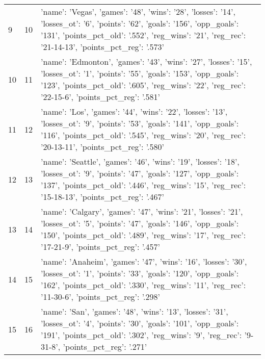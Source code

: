 \begin{tabular}{lrl}
9 & 10 & {'name': 'Vegas', 'games': '48', 'wins': '28', 'losses': '14', 'losses_ot': '6', 'points': '62', 'goals': '156', 'opp_goals': '131', 'points_pct_old': '.552', 'reg_wins': '21', 'reg_rec': '21-14-13', 'points_pct_reg': '.573'} \\
10 & 11 & {'name': 'Edmonton', 'games': '43', 'wins': '27', 'losses': '15', 'losses_ot': '1', 'points': '55', 'goals': '153', 'opp_goals': '123', 'points_pct_old': '.605', 'reg_wins': '22', 'reg_rec': '22-15-6', 'points_pct_reg': '.581'} \\
11 & 12 & {'name': 'Los', 'games': '44', 'wins': '22', 'losses': '13', 'losses_ot': '9', 'points': '53', 'goals': '141', 'opp_goals': '116', 'points_pct_old': '.545', 'reg_wins': '20', 'reg_rec': '20-13-11', 'points_pct_reg': '.580'} \\
12 & 13 & {'name': 'Seattle', 'games': '46', 'wins': '19', 'losses': '18', 'losses_ot': '9', 'points': '47', 'goals': '127', 'opp_goals': '137', 'points_pct_old': '.446', 'reg_wins': '15', 'reg_rec': '15-18-13', 'points_pct_reg': '.467'} \\
13 & 14 & {'name': 'Calgary', 'games': '47', 'wins': '21', 'losses': '21', 'losses_ot': '5', 'points': '47', 'goals': '146', 'opp_goals': '150', 'points_pct_old': '.489', 'reg_wins': '17', 'reg_rec': '17-21-9', 'points_pct_reg': '.457'} \\
14 & 15 & {'name': 'Anaheim', 'games': '47', 'wins': '16', 'losses': '30', 'losses_ot': '1', 'points': '33', 'goals': '120', 'opp_goals': '162', 'points_pct_old': '.330', 'reg_wins': '11', 'reg_rec': '11-30-6', 'points_pct_reg': '.298'} \\
15 & 16 & {'name': 'San', 'games': '48', 'wins': '13', 'losses': '31', 'losses_ot': '4', 'points': '30', 'goals': '101', 'opp_goals': '191', 'points_pct_old': '.302', 'reg_wins': '9', 'reg_rec': '9-31-8', 'points_pct_reg': '.271'} \\
\end{tabular}


